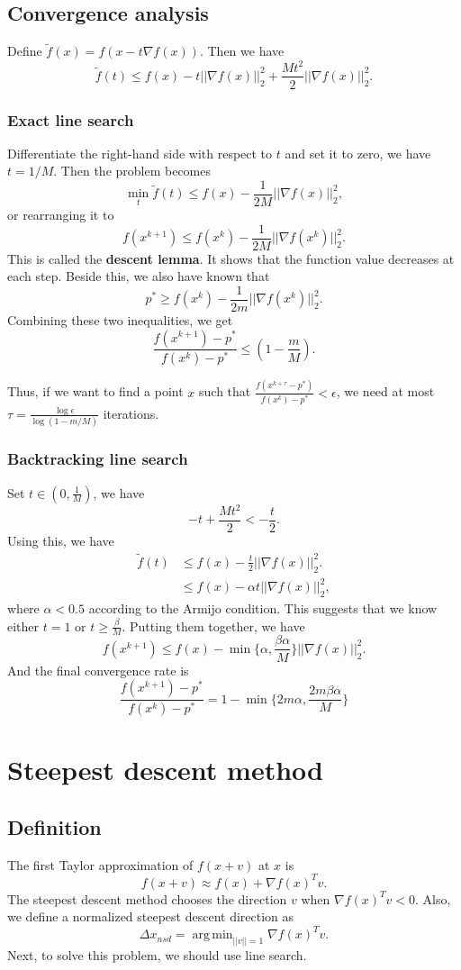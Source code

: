 \documentclass[lang=en,color=blue,mode=fancy,titlestyle=hang]{elegantbook}
\DeclareMathOperator*{\argmin}{arg\,min}
\begin{document}
\subsection{Convergence analysis}
Define $\tilde{f}(x) = f(x - t \nabla f(x))$. Then we have
\[
\tilde{f}(t) \leq f(x) - t||\nabla f(x)||_2^2 + \frac{Mt^2}{2} ||\nabla f(x)||_2^2.
\]

\subsubsection{Exact line search} Differentiate the right-hand side with respect to $t$ and set it to
zero, we have $t = 1/M$. Then the problem becomes
\[
\min_t \tilde{f}(t) \leq f(x) - \frac{1}{2M} ||\nabla f(x)||_2^2,
\]
or rearranging it to
\[
f(x^{k+1}) \leq f(x^k) - \frac{1}{2M} ||\nabla f(x^k)||_2^2.
\]
This is called the \textbf{descent lemma}. It shows that the function value decreases at each step.
Beside this, we also have known that
\[
p^* \geq f(x^k) - \frac{1}{2m} ||\nabla f(x^k)||_2^2.
\]
Combining these two inequalities, we get
\[
\frac{f(x^{k+1}) - p^*}{f(x^k) - p^*} \leq (1 - \frac{m}{M}).
\]

Thus, if we want to find a point $x$ such that $\frac{f(x^{k+\tau}-p^*)}{f(x^k)-p^*} < \epsilon$,
we need at most $\tau = \frac{\log \epsilon}{\log (1 - m/M)}$ iterations.

\subsubsection{Backtracking line search} Set $t \in (0, \frac{1}{M})$, we have
\[
-t + \frac{Mt^2}{2} < -\frac{t}{2}.
\]
Using this, we have
\begin{align*}
\tilde{f}(t) &\leq f(x) - \frac{t}{2} ||\nabla f(x)||_2^2.\\
&\leq f(x) - \alpha t||\nabla f(x)||_2^2,
\end{align*}
where $\alpha <0.5$ according to the Armijo condition. This suggests that we know either $t = 1$
or $t \geq \frac{\beta}{M}$. Putting them together, we have
\[
f(x^{k+1}) \leq f(x) - \min\{\alpha, \frac{\beta \alpha}{M}\} ||\nabla f(x)||_2^2.
\]
And the final convergence rate is
\[
\frac{f(x^{k+1}) - p^*}{f(x^k) - p^*} = 1 - \min\{ 2m \alpha, \frac{2m \beta \alpha}{M} \}
\]

\section{Steepest descent method}
\subsection{Definition}
The first Taylor approximation of $f(x + v)$ at $x$ is
\[
f(x + v) \approx f(x) + \nabla f(x)^T v.
\]
The steepest descent method chooses the direction $v$ when $\nabla f(x)^T v < 0$. Also, we define
a normalized steepest descent direction as
\[
\Delta x_{nsd} = \argmin_{||v|| = 1} \nabla f(x)^T v.
\]
Next, to solve this problem, we should use line search.
\end{document}
